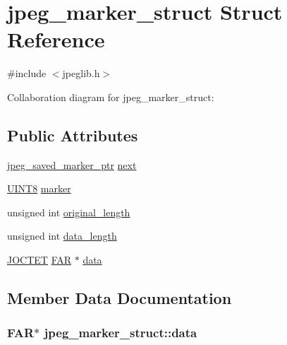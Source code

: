 \hypertarget{structjpeg__marker__struct}{}\section{jpeg\+\_\+marker\+\_\+struct Struct Reference}
\label{structjpeg__marker__struct}


{\ttfamily \#include $<$jpeglib.\+h$>$}



Collaboration diagram for jpeg\+\_\+marker\+\_\+struct\+:
\subsection*{Public Attributes}
\begin{DoxyCompactItemize}
\item 
\hyperlink{jpeglib_8h_a2efb5205b3e81589f2dc133f1a412bb0}{jpeg\+\_\+saved\+\_\+marker\+\_\+ptr} \hyperlink{structjpeg__marker__struct_a1cb619806ea91b42a46b2a04fafabd82}{next}
\item 
\hyperlink{jmorecfg_8h_adfb9a8ea1dd59f151065f763e1e9acd6}{U\+I\+N\+T8} \hyperlink{structjpeg__marker__struct_a154cf70fc9b4f86da631ca08a12a8d33}{marker}
\item 
unsigned int \hyperlink{structjpeg__marker__struct_a3b17d58a17fa6be8560b697da814dfd3}{original\+\_\+length}
\item 
unsigned int \hyperlink{structjpeg__marker__struct_a98412e9bccde6954ce55f611ad146a6b}{data\+\_\+length}
\item 
\hyperlink{jmorecfg_8h_a356ad249f20e691b520da439f92cccbc}{J\+O\+C\+T\+E\+T} \hyperlink{jmorecfg_8h_aef060b3456fdcc093a7210a762d5f2ed}{F\+A\+R} $\ast$ \hyperlink{structjpeg__marker__struct_ac8d0d5b3294a6ac3629640d4164a1ea6}{data}
\end{DoxyCompactItemize}


\subsection{Member Data Documentation}
\hypertarget{structjpeg__marker__struct_ac8d0d5b3294a6ac3629640d4164a1ea6}{}
\subsubsection[{data}]{ {\bf F\+A\+R}$\ast$ jpeg\+\_\+marker\+\_\+struct\+::data}\label{structjpeg__marker__struct_ac8d0d5b3294a6ac3629640d4164a1ea6}
\hypertarget{structjpeg__marker__struct_a98412e9bccde6954ce55f611ad146a6b}{}
